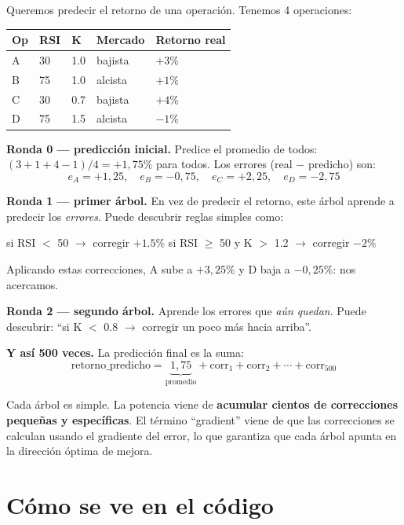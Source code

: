 \documentclass[11pt,a4paper]{report}
\begin{document}
\begin{ejemplo}
Queremos predecir el retorno de una operación. Tenemos 4 operaciones:
\begin{center}\small
\begin{tabular}{@{}lllll@{}}
\toprule
Op & RSI & K & Mercado & Retorno real \\
\midrule
A & 30 & 1.0 & bajista & $+3\%$ \\
B & 75 & 1.0 & alcista & $+1\%$ \\
C & 30 & 0.7 & bajista & $+4\%$ \\
D & 75 & 1.5 & alcista & $-1\%$ \\
\bottomrule
\end{tabular}
\end{center}

\textbf{Ronda 0 — predicción inicial.} Predice el promedio de todos: $(3+1+4-1)/4 = +1{,}75\%$
para todos. Los errores (real $-$ predicho) son:
\[
e_A = +1{,}25,\quad e_B = -0{,}75,\quad e_C = +2{,}25,\quad e_D = -2{,}75
\]

\textbf{Ronda 1 — primer árbol.} En vez de predecir el retorno, este árbol aprende a predecir los
\emph{errores}. Puede descubrir reglas simples como:
\begin{center}\small\ttfamily
si RSI $<$ 50 $\rightarrow$ corregir $+1.5\%$ \qquad si RSI $\geq$ 50 y K $>$ 1.2 $\rightarrow$ corregir $-2\%$
\end{center}
Aplicando estas correcciones, A sube a $+3{,}25\%$ y D baja a $-0{,}25\%$: nos acercamos.

\textbf{Ronda 2 — segundo árbol.} Aprende los errores que \emph{aún quedan}. Puede descubrir:
``si K $<$ 0.8 $\rightarrow$ corregir un poco más hacia arriba''.

\textbf{Y así 500 veces.} La predicción final es la suma:
\[
\text{retorno\_predicho} = \underbrace{1{,}75}_{\text{promedio}} + \text{corr}_1 + \text{corr}_2 + \cdots + \text{corr}_{500}
\]
\end{ejemplo}

Cada árbol es simple. La potencia viene de \textbf{acumular cientos de correcciones pequeñas y
específicas}. El término ``gradient'' viene de que las correcciones se calculan usando el gradiente
del error, lo que garantiza que cada árbol apunta en la dirección óptima de mejora.

\section{Cómo se ve en el código}
\end{document}
